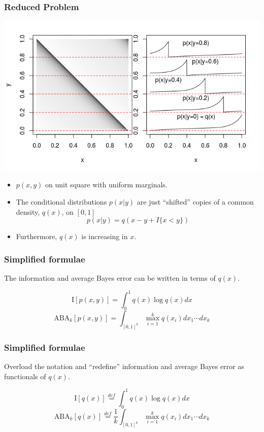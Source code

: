 \documentclass{beamer}
\begin{document}
\begin{frame}
\frametitle{Reduced Problem}

\begin{center}
\includegraphics[scale = 0.4]{../diagram/qxplot.png}
\end{center}

\begin{itemize}
\item $p(x, y)$ on unit square with uniform marginals.
\item The conditional distributions $p(x|y)$ are just ``shifted'' copies of a common density, $q(x)$, on $[0,1]$
\[
p(x|y) = q(x - y + I\{x < y\})
\]
\item Furthermore, $q(x)$ is increasing in $x$.
\end{itemize}


\end{frame}

\begin{frame}
\frametitle{Simplified formulae}

The information and average Bayes error can be written in terms of $q(x)$.

\[
\text{I}[p(x, y)] = \int_0^1 q(x) \log q(x) dx
\]
\[
\text{ABA}_k[p(x, y)] = \int_{[0, 1]^k} \max_{i=1}^k q(x_i) dx_1 \cdots dx_k
\]

\end{frame}

\begin{frame}
\frametitle{Simplified formulae}

Overload the notation and ``redefine'' information and average Bayes error as functionals of $q(x)$.

\[
\text{I}[q(x)] \stackrel{def}{=} \int_0^1 q(x) \log q(x) dx
\]
\[
\text{ABA}_k[q(x)] \stackrel{def}{=} \frac{1}{k}\int_{[0, 1]^k} \max_{i=1}^k q(x_i) dx_1 \cdots dx_k
\]

\end{frame}
\end{document}
